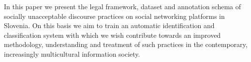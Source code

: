 In this paper we present the legal framework, dataset and annotation schema of socially unacceptable discourse practices on social networking platforms in Slovenia. On this basis we aim to train an automatic identification and classification system with which we wish contribute towards an improved methodology, understanding and treatment of such practices in the contemporary, increasingly multicultural information society.
